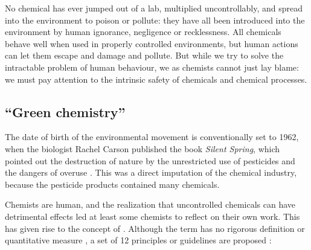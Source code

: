 No chemical has ever jumped out of a lab, multiplied uncontrollably, and spread
into the environment to poison or pollute: they have all been introduced into
the environment by human ignorance, negligence or recklessness. All chemicals
behave well when used in properly controlled environments, but human actions can
let them escape and damage and pollute. But while we try to solve the
intractable problem of human behaviour, we as chemists cannot just lay blame: we
must pay attention to the intrinsic safety of chemicals and chemical processes.
 
\subsection{``Green chemistry''}
\label{sec:GreenChemistry}
The date of birth of the environmental movement is conventionally set to 1962, when
the biologist Rachel Carson published the book \textit{Silent Spring}, which
pointed out the destruction of nature by the unrestricted use of pesticides and
the dangers of overuse \autocite{Carson1962}. This was a direct imputation of
the chemical industry, because the pesticide products contained many chemicals.

Chemists are human, and the realization that uncontrolled chemicals can have
detrimental effects led at least some chemists to reflect on their own work.
This has given rise to the concept of . Although the
term has no rigorous definition or quantitative measure
\autocite{Linthorst2010}, a set of 12 principles or guidelines are proposed
\autocite{Anastas1998}:

